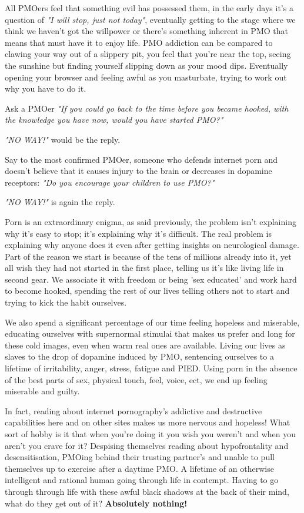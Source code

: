 \documentclass[easypeasy.tex]{subfiles}
\begin{document}
All PMOers feel that something evil has possessed them, in the early days it's a question of \textit{"I will stop, just not today"}, eventually getting to the stage where we think we haven't got the willpower or there's something inherent in PMO that means that must have it to enjoy life. PMO addiction can be compared to clawing your way out of a slippery pit, you feel that you're near the top, seeing the sunshine but finding yourself slipping down as your mood dips. Eventually opening your browser and feeling awful as you masturbate, trying to work out why you have to do it.

Ask a PMOer \textit{"If you could go back to the time before you became hooked, with the knowledge you have now, would you have started PMO?"}

\textit{"NO WAY!"} would be the reply.

Say to the most confirmed PMOer, someone who defends internet porn and doesn't believe that it causes injury to the brain or decreases in dopamine receptors: \textit{"Do you encourage your children to use PMO?"}

\textit{"NO WAY!"} is again the reply.

Porn is an extraordinary enigma, as said previously, the problem isn't explaining why it's easy to stop; it's explaining why it's difficult. The real problem is explaining why anyone does it even after getting insights on neurological damage. Part of the reason we start is because of the tens of millions already into it, yet all wish they had not started in the first place, telling us it's like living life in second gear. We associate it with freedom or being 'sex educated' and work hard to become hooked, spending the rest of our lives telling others not to start and trying to kick the habit ourselves.

We also spend a significant percentage of our time feeling hopeless and miserable, educating ourselves with supernormal stimulai that makes us prefer and long for these cold images, even when warm real ones are available. Living our lives as slaves to the drop of dopamine induced by PMO, sentencing ourselves to a lifetime of irritability, anger, stress, fatigue and PIED. Using porn in the absence of the best parts of sex, physical touch, feel, voice, ect, we end up feeling miserable and guilty.

In fact, reading about internet pornography's addictive and destructive capabilities here and on other sites makes us more nervous and hopeless! What sort of hobby is it that when you're doing it you wish you weren't and when you aren't you crave for it? Despising themselves reading about hypofrontality and desensitisation, PMOing behind their trusting partner's and unable to pull themselves up to exercise after a daytime PMO. A lifetime of an otherwise intelligent and rational human going through life in contempt. Having to go through through life with these awful black shadows at the back of their mind, what do they get out of it? \textbf{Absolutely nothing!}
\end{document}
